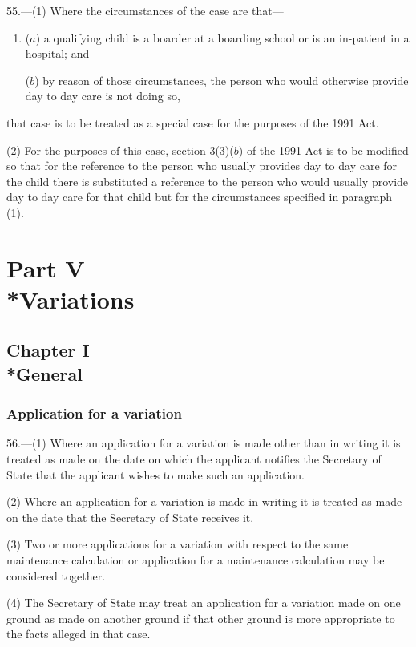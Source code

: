 \documentclass[12pt,a4paper]{article}
\begin{document}
55.---(1)  Where the circumstances of the case are that—
\begin{enumerate}\item[]
($a$) a qualifying child is a boarder at a boarding school or is an in-patient in a hospital; and

($b$) by reason of those circumstances, the person who would otherwise provide day to day care is not doing so,
\end{enumerate}
that case is to be treated as a special case for the purposes of the 1991 Act.

(2) For the purposes of this case, section 3(3)($b$)  of the 1991 Act is to be modified so that for the reference to the person who usually provides day to day care for the child there is substituted a reference to the person who would usually provide day to day care for that child but for the circumstances specified in paragraph (1).

\section[Part V --- Variations]{Part V\\*Variations}

\subsection[Chapter I --- General]{Chapter I\\*General}

\renewcommand\parthead{--- Part V Chapter I}

\subsubsection[56. Application for a variation]{Application for a variation}

56.---(1)  Where an application for a variation is made other than in writing it is treated as made on the date on which the applicant notifies the Secretary of State that the applicant wishes to make such an application.

(2) Where an application for a variation is made in writing it is treated as made on the date that the Secretary of State receives it.

(3) Two or more applications for a variation with respect to the same maintenance calculation or application for a maintenance calculation may be considered together.

(4) The Secretary of State may treat an application for a variation made on one ground as made on another ground if that other ground is more appropriate to the facts alleged in that case.
\end{document}

